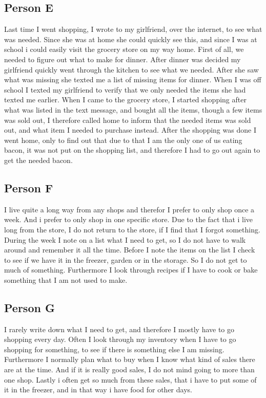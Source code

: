 \subsection{Person E}
Last time I went shopping, I wrote to my girlfriend, over the internet, to see what was needed. Since she was at home she could quickly see this, and since I was at school i could easily  visit the grocery store on my way home. First of all, we needed to figure out what to make for dinner. After dinner was decided my girlfriend quickly went through the kitchen to see what we needed. After she saw what was missing she texted me a list of missing items for dinner. When I was off school I texted my girlfriend to verify that we only needed the items she had texted me earlier. When I came to the grocery store, I started shopping after what was listed in the text message, and bought all the items, though a few items was sold out, I  therefore called home to inform that the needed items was sold out, and what item I needed to purchase instead. After the shopping was done I went home, only to find out that due to that I am the only one of us eating bacon, it was not put on the shopping list, and therefore I had to go out again to get the needed bacon.

\subsection{Person F}
I live quite a long way from any shops and therefor I prefer to only shop once a week. And i prefer to only shop in one specific store. Due to the fact that i live long from the store, I do not return to the store, if I find that I forgot something. During the week I note on a list what I need to get, so I do not have to walk around and remember it all the time. Before I note the items on the list I check to see if we have it in the freezer, garden or in the storage. So I do not get to much of something. Furthermore I look through recipes if I have to cook or bake something that I am not used to make.

\subsection{Person G}
I rarely write down what I need to get, and therefore I mostly have to go shopping every day. Often I look through my inventory when I have to go shopping for something, to see if there is something else I am missing. Furthermore I normally plan what to buy when I know what kind of sales there are at the time. And if it is really good sales, I do not mind going to more than one shop. Lastly i often get so much from these sales, that i have to put some of it in the freezer, and in that way i have food for other days.